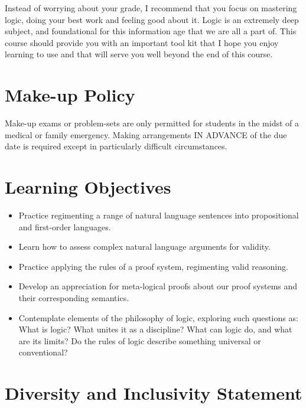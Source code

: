 \documentclass[letterpaper]{inzane_syllabus} %
\begin{document}
Instead of worrying about your grade, I recommend that you focus on mastering logic, doing your best work and feeling good about it.
Logic is an extremely deep subject, and foundational for this information age that we are all a part of.
This course should provide you with an important tool kit that I hope you enjoy learning to use and that will serve you well beyond the end of this course.

\vspace{0.5cm}
\section{Make-up Policy}

Make-up exams or problem-sets are only permitted for students in the midst of a medical or family emergency.
Making arrangements IN ADVANCE of the due date is required except in particularly difficult circumstances.

\vspace{0.5cm}
\section{Learning Objectives}

\begin{itemize}
  \item Practice regimenting a range of natural language sentences into propositional and first-order languages.
  \item Learn how to assess complex natural language arguments for validity.
  \item Practice applying the rules of a proof system, regimenting valid reasoning.
  \item Develop an appreciation for meta-logical proofs about our proof systems and their corresponding semantics.
  \item Contemplate elements of the philosophy of logic, exploring such questions as: What is logic? What unites it as a discipline? What can logic do, and what are its limits? Do the rules of logic describe something universal or conventional?
\end{itemize}

\vspace{0.5cm}
\section{Diversity and Inclusivity Statement}
\end{document}
